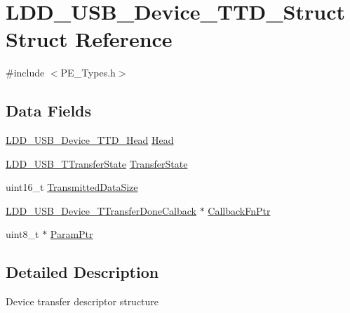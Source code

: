 \hypertarget{struct_l_d_d___u_s_b___device___t_t_d___struct}{\section{L\-D\-D\-\_\-\-U\-S\-B\-\_\-\-Device\-\_\-\-T\-T\-D\-\_\-\-Struct Struct Reference}
\label{struct_l_d_d___u_s_b___device___t_t_d___struct}
}


{\ttfamily \#include $<$P\-E\-\_\-\-Types.\-h$>$}

\subsection*{Data Fields}
\begin{DoxyCompactItemize}
\item 
\hyperlink{group___p_e___types__module_gac26d0354d0c874cd4e4580525d70c0c1}{L\-D\-D\-\_\-\-U\-S\-B\-\_\-\-Device\-\_\-\-T\-T\-D\-\_\-\-Head} \hyperlink{struct_l_d_d___u_s_b___device___t_t_d___struct_a7f3947a676f6ecd32e3fb342b7f07a35}{Head}
\item 
\hyperlink{group___p_e___types__module_gacf5f7e704d87aba90dc002ed7c0d28b4}{L\-D\-D\-\_\-\-U\-S\-B\-\_\-\-T\-Transfer\-State} \hyperlink{struct_l_d_d___u_s_b___device___t_t_d___struct_aca23e3743f56dc73206b79f885e9130f}{Transfer\-State}
\item 
uint16\-\_\-t \hyperlink{struct_l_d_d___u_s_b___device___t_t_d___struct_aeffbf1300fce5fc9ebf98f5760a96d38}{Transmitted\-Data\-Size}
\item 
\hyperlink{group___p_e___types__module_ga9936cce5f7b95eff5c8ee57e854d97b3}{L\-D\-D\-\_\-\-U\-S\-B\-\_\-\-Device\-\_\-\-T\-Transfer\-Done\-Calback} $\ast$ \hyperlink{struct_l_d_d___u_s_b___device___t_t_d___struct_aaff3a74a2abea1e6b530ecfdaff8c584}{Callback\-Fn\-Ptr}
\item 
uint8\-\_\-t $\ast$ \hyperlink{struct_l_d_d___u_s_b___device___t_t_d___struct_ab1f3a3912ae70d748c5891aa91804de4}{Param\-Ptr}
\end{DoxyCompactItemize}


\subsection{Detailed Description}
Device transfer descriptor structure 

